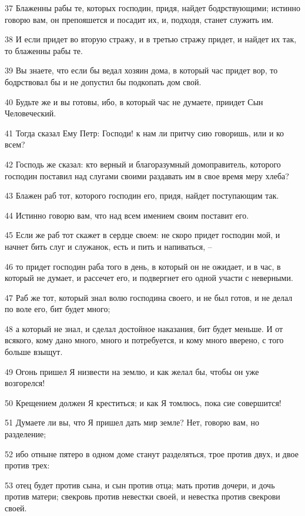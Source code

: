 \par 37 Блаженны рабы те, которых господин, придя, найдет бодрствующими; истинно говорю вам, он препояшется и посадит их, и, подходя, станет служить им.
\par 38 И если придет во вторую стражу, и в третью стражу придет, и найдет их так, то блаженны рабы те.
\par 39 Вы знаете, что если бы ведал хозяин дома, в который час придет вор, то бодрствовал бы и не допустил бы подкопать дом свой.
\par 40 Будьте же и вы готовы, ибо, в который час не думаете, приидет Сын Человеческий.
\par 41 Тогда сказал Ему Петр: Господи! к нам ли притчу сию говоришь, или и ко всем?
\par 42 Господь же сказал: кто верный и благоразумный домоправитель, которого господин поставил над слугами своими раздавать им в свое время меру хлеба?
\par 43 Блажен раб тот, которого господин его, придя, найдет поступающим так.
\par 44 Истинно говорю вам, что над всем имением своим поставит его.
\par 45 Если же раб тот скажет в сердце своем: не скоро придет господин мой, и начнет бить слуг и служанок, есть и пить и напиваться, --
\par 46 то придет господин раба того в день, в который он не ожидает, и в час, в который не думает, и рассечет его, и подвергнет его одной участи с неверными.
\par 47 Раб же тот, который знал волю господина своего, и не был готов, и не делал по воле его, бит будет много;
\par 48 а который не знал, и сделал достойное наказания, бит будет меньше. И от всякого, кому дано много, много и потребуется, и кому много вверено, с того больше взыщут.
\par 49 Огонь пришел Я низвести на землю, и как желал бы, чтобы он уже возгорелся!
\par 50 Крещением должен Я креститься; и как Я томлюсь, пока сие совершится!
\par 51 Думаете ли вы, что Я пришел дать мир земле? Нет, говорю вам, но разделение;
\par 52 ибо отныне пятеро в одном доме станут разделяться, трое против двух, и двое против трех:
\par 53 отец будет против сына, и сын против отца; мать против дочери, и дочь против матери; свекровь против невестки своей, и невестка против свекрови своей.
